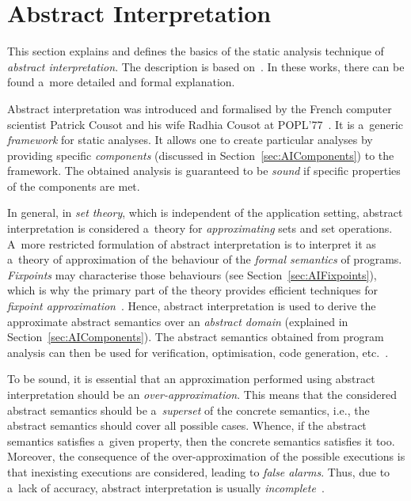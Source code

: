 \section{Abstract Interpretation}
\label{sec:AI}

This section explains and defines the basics of the static analysis technique of \emph{abstract interpretation}. The description is based on~\cite{AICousotWeb, AIInNutshellCousot, AIBasedFormalMethodsCousot, AILatticeModelCousot, wideningNarrowingCousot, analysisAndVerVojnarKrena, savAI, staticAnalysisMoller, programAnalysisNielson, staticAnalysisRival}. In these works, there can be found a~more detailed and formal explanation.

Abstract interpretation was introduced and formalised by the French computer scientist Patrick Cousot and his wife Radhia Cousot at POPL'77~\cite{AILatticeModelCousot}. It is a~generic \emph{framework} for static analyses. It allows one to create particular analyses by providing specific \emph{components} (discussed in Section~\ref{sec:AIComponents}) to the framework. The obtained analysis is guaranteed to be \emph{sound} if specific properties of the components are met.

In general, in \emph{set theory}, which is independent of the application setting, abstract interpretation is considered a~theory for \emph{approximating} sets and set operations. A~more restricted formulation of abstract interpretation is to interpret it as a~theory of approximation of the behaviour of the \emph{formal semantics} of programs. \emph{Fixpoints} may characterise those behaviours (see Section~\ref{sec:AIFixpoints}), which is why the primary part of the theory provides efficient techniques for \emph{fixpoint approximation}~\cite{programAnalysisNielson}. Hence, abstract interpretation is used to derive the approximate abstract semantics over an \emph{abstract domain} (explained in Section~\ref{sec:AIComponents}). The abstract semantics obtained from program analysis can then be used for verification, optimisation, code generation, etc.~\cite{AIBasedFormalMethodsCousot}.

To be sound, it is essential that an approximation performed using abstract interpretation should be an \emph{over-approximation}. This means that the considered abstract semantics should be a~\emph{superset} of the concrete semantics, i.e., the abstract semantics should cover all possible cases. Whence, if the abstract semantics satisfies a~given property, then the concrete semantics satisfies it too. Moreover, the consequence of the over-approximation of the possible executions is that inexisting executions are considered, leading to \emph{false alarms}. Thus, due to a~lack of accuracy, abstract interpretation is usually \emph{incomplete}~\cite{AIInNutshellCousot}.

